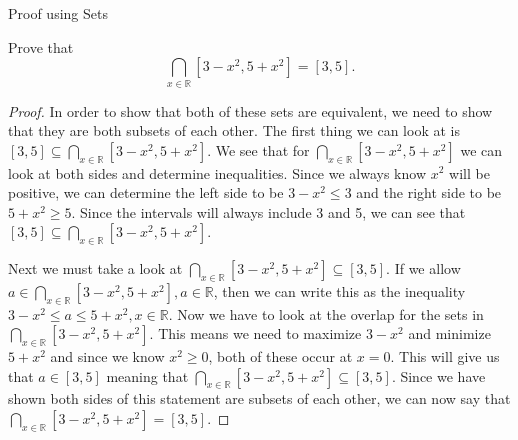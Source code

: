 Proof using Sets

Prove that 
\[\bigcap_{x\in\mathbb{R}} [3-x^2,5+x^2]=[3,5].\]

\begin{proof}
In order to show that both of these sets are equivalent, we need to show that they are both subsets of each other. The first thing we can look at is $[3,5]\subseteq\bigcap_{x\in\mathbb{R}} [3-x^2,5+x^2]$. We see that for $\bigcap_{x\in\mathbb{R}} [3-x^2,5+x^2]$ we can look at both sides and determine inequalities. Since we always know $x^2$ will be positive, we can determine the left side to be $ 3 - x^2 \leq 3$ and the right side to be $5 + x^2 \geq 5$. Since the intervals will always include 3 and 5, we can see that $[3,5]\subseteq\bigcap_{x\in\mathbb{R}} [3-x^2,5+x^2]$. 

Next we must take a look at $\bigcap_{x\in\mathbb{R}} [3-x^2,5+x^2]\subseteq[3,5].$ If we allow $ a \in \bigcap_{x\in\mathbb{R}} [3-x^2,5+x^2], a \in \mathbb{R}$, then we can write this as the inequality $3 - x^2 \leq a \leq 5 + x^2, x \in \mathbb{R}$. Now we have to look at the overlap for the sets in $\bigcap_{x\in\mathbb{R}} [3-x^2,5+x^2]$. This means we need to maximize $3 - x^2$ and minimize $5 + x^2$ and since we know $x^2 \geq 0$, both of these occur at $x=0$. This will give us that $a \in [3,5]$ meaning that $\bigcap_{x\in\mathbb{R}} [3-x^2,5+x^2]\subseteq[3,5]$. Since we have shown both sides of this statement are subsets of each other, we can now say that $\bigcap_{x\in\mathbb{R}} [3-x^2,5+x^2]=[3,5].$
\end{proof}